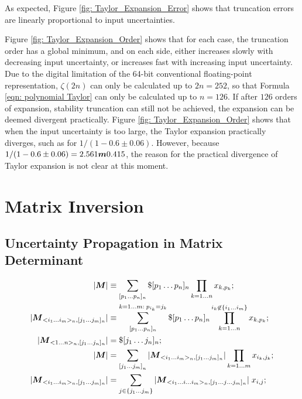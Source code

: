 \documentclass[twoside]{article}
\numberwithin{equation}{section}
\begin{document}
As expected, Figure \ref{fig: Taylor_Expansion_Error} shows that truncation errors are linearly proportional to input uncertainties.

Figure \ref{fig: Taylor_Expansion_Order} shows that for each case, the truncation order has a global minimum, and on each side, either increases slowly with decreasing input uncertainty, or increases fast with increasing input uncertainty.
Due to the digital limitation of the 64-bit conventional floating-point representation, $\zeta(2n)$ can only be calculated up to $2n = 252$, so that Formula \eqref{eqn: polynomial Taylor} can only be calculated up to $n = 126$.
If after $126$ orders of expansion, stability truncation can still not be achieved, the expansion can be deemed divergent practically.
Figure \ref{fig: Taylor_Expansion_Order} shows that when the input uncertainty is too large, the Taylor expansion practically diverges, such as for $1/(1 - 0.6 \pm 0.06)$.
However, because $1/(1 - 0.6 \pm 0.06) = 2.561 \protect{\textrm{\boldmath $m$}} 0.415$, the reason for the practical divergence of Taylor expansion is not clear at this moment.






\clearpage
\section{Matrix Inversion}
\label{sec: matrix}


\subsection{Uncertainty Propagation in Matrix Determinant}

\iffalse

\begin{align*}
|\protect{\textrm{\boldmath $M$}}| &\equiv \sum_{[p_1\dots p_n]_n} \$ [p_1\dots p_n]_n \prod_{k=1 \dots n} x_{k,p_{k}}; \\
|\protect{\textrm{\boldmath $M$}}_{<i_1 \dots i_m>_n, [j_1 \dots j_m]_n}| &\equiv \sum_{[p_1 \dots p_n]_n}^{k =1 \dots m:\; p_{i_k}=j_k} \$ [p_1\dots p_n]_n 
	\prod _{k = 1 \dots n }^{i_k \not\in \{i_1 \dots i_m\}} x_{k,p_{k}}; \\
|\protect{\textrm{\boldmath $M$}}_{<1 \dots n>_n, [j_1 \dots j_n]_n}| &= \$ [j_1\dots j_n]_n; \\
|\protect{\textrm{\boldmath $M$}}| &= \sum_{{[j_1 \dots j_m]}_n} |\protect{\textrm{\boldmath $M$}} _{<i_1 \dots i_m>_n, [j_1 \dots j_m]_n}| \prod_{k=1 \dots m} x_{i_k, j_k}; \\
|\protect{\textrm{\boldmath $M$}}_{<i_1 \dots i_m>_n, [j_1 \dots j_m]_n}| &= \sum_{j \in \{j_1 \dots j_m\}} |\protect{\textrm{\boldmath $M$}}_{<i_1 \dots i \dots i_m>_n, [j_1 \dots j \dots j_m]_n}| \;x_{i, j};
\end{align*}
\end{document}
